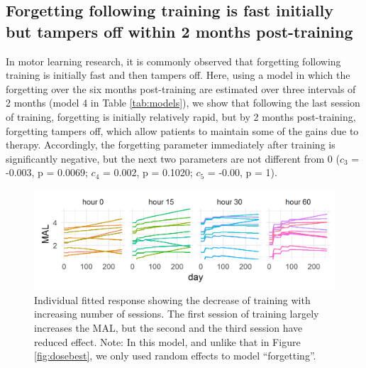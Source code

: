 \subsection{Forgetting following training is fast initially but tampers off within 2 months post-training}
In motor learning research, it is commonly observed that forgetting following training is initially fast and then tampers off. 
Here, using a model in which the forgetting over the six months post-training are estimated over three intervals of 2 months (model 4 in Table \ref{tab:models}), we show that following the last session of training, forgetting is initially relatively rapid, but by 2 months post-training, forgetting tampers off, which allow patients to maintain some of the gains due to therapy. 
Accordingly, the forgetting parameter immediately after training is significantly negative, but the next two parameters are not different from 0 ($ c_3 $ = -0.003, p = 0.0069; $ c_4 $ = 0.002, p = 0.1020; $ c_5 $ = -0.00, p = 1).

\begin{figure}
	\centering
	\includegraphics[width=\linewidth]{figures/Ind_timing_efficiency_b_c}
	\caption[Individual fitted response showing the decrease of training with increasing number of sessions.]{Individual fitted response showing the decrease of training with increasing number of sessions. The first session of training largely increases the MAL, but the second and the third session have reduced effect. Note: In this model, and unlike that in Figure \ref{fig:dosebest}, we only used random effects to model “forgetting”.}
	\label{fig:indtimingefficiencybc}
\end{figure}


